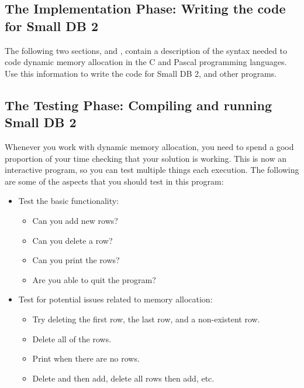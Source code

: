 
\subsection{The Implementation Phase: Writing the code for Small DB 2} %
\label{sub:writing_the_code_for_small_db_2}

The following two sections,   and   , contain a description of the syntax needed to code dynamic memory allocation in the C and Pascal programming languages. Use this information to write the code for Small DB 2, and other programs.


\subsection{The Testing Phase: Compiling and running Small DB 2} %
\label{ssub:the_testing_phase_compiling_and_running_small_db_2}

Whenever you work with dynamic memory allocation, you need to spend a good proportion of your time checking that your solution is working. This is now an interactive program, so you can test multiple things each execution. The following are some of the aspects that you should test in this program:

\begin{itemize}
  \item Test the basic functionality:
  \begin{itemize}
    \item Can you add new rows?
    \item Can you delete a row?
    \item Can you print the rows?
    \item Are you able to quit the program?
  \end{itemize}
  \item Test for potential issues related to memory allocation:
  \begin{itemize}
    \item Try deleting the first row, the last row, and a non-existent row.
    \item Delete all of the rows.
    \item Print when there are no rows.
    \item Delete and then add, delete all rows then add, etc.
  \end{itemize}
\end{itemize}

